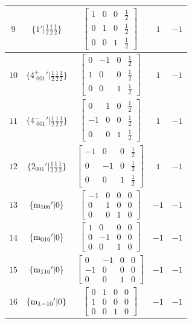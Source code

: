 \documentclass[fleqn,8pt]{jsarticle}
\begin{document}
\begin{longtable}{ccccc}
$ 9 $ & $ \{1{}'|\frac{1}{2} \frac{1}{2} \frac{1}{2}\} $ & $ \begin{bmatrix} 1 & 0 & 0 & \frac{1}{2} \\ 0 & 1 & 0 & \frac{1}{2} \\ 0 & 0 & 1 & \frac{1}{2} \end{bmatrix} $ & $ 1 $ & $ -1 $ \\ \hline
$ 10 $ & $ \{4^{+}_{\,\,001}{}'|\frac{1}{2} \frac{1}{2} \frac{1}{2}\} $ & $ \begin{bmatrix} 0 & -1 & 0 & \frac{1}{2} \\ 1 & 0 & 0 & \frac{1}{2} \\ 0 & 0 & 1 & \frac{1}{2} \end{bmatrix} $ & $ 1 $ & $ -1 $ \\ \hline
$ 11 $ & $ \{4^{-}_{\,\,001}{}'|\frac{1}{2} \frac{1}{2} \frac{1}{2}\} $ & $ \begin{bmatrix} 0 & 1 & 0 & \frac{1}{2} \\ -1 & 0 & 0 & \frac{1}{2} \\ 0 & 0 & 1 & \frac{1}{2} \end{bmatrix} $ & $ 1 $ & $ -1 $ \\ \hline
$ 12 $ & $ \{2{}_{001}{}'|\frac{1}{2} \frac{1}{2} \frac{1}{2}\} $ & $ \begin{bmatrix} -1 & 0 & 0 & \frac{1}{2} \\ 0 & -1 & 0 & \frac{1}{2} \\ 0 & 0 & 1 & \frac{1}{2} \end{bmatrix} $ & $ 1 $ & $ -1 $ \\ \hline
$ 13 $ & $ \{{\rm m}_{100}{}'|0\} $ & $ \begin{bmatrix} -1 & 0 & 0 & 0 \\ 0 & 1 & 0 & 0 \\ 0 & 0 & 1 & 0 \end{bmatrix} $ & $ -1 $ & $ -1 $ \\ \hline
$ 14 $ & $ \{{\rm m}_{010}{}'|0\} $ & $ \begin{bmatrix} 1 & 0 & 0 & 0 \\ 0 & -1 & 0 & 0 \\ 0 & 0 & 1 & 0 \end{bmatrix} $ & $ -1 $ & $ -1 $ \\ \hline
$ 15 $ & $ \{{\rm m}_{110}{}'|0\} $ & $ \begin{bmatrix} 0 & -1 & 0 & 0 \\ -1 & 0 & 0 & 0 \\ 0 & 0 & 1 & 0 \end{bmatrix} $ & $ -1 $ & $ -1 $ \\ \hline
$ 16 $ & $ \{{\rm m}_{1-10}{}'|0\} $ & $ \begin{bmatrix} 0 & 1 & 0 & 0 \\ 1 & 0 & 0 & 0 \\ 0 & 0 & 1 & 0 \end{bmatrix} $ & $ -1 $ & $ -1 $ \\
\end{longtable}
\end{document}
